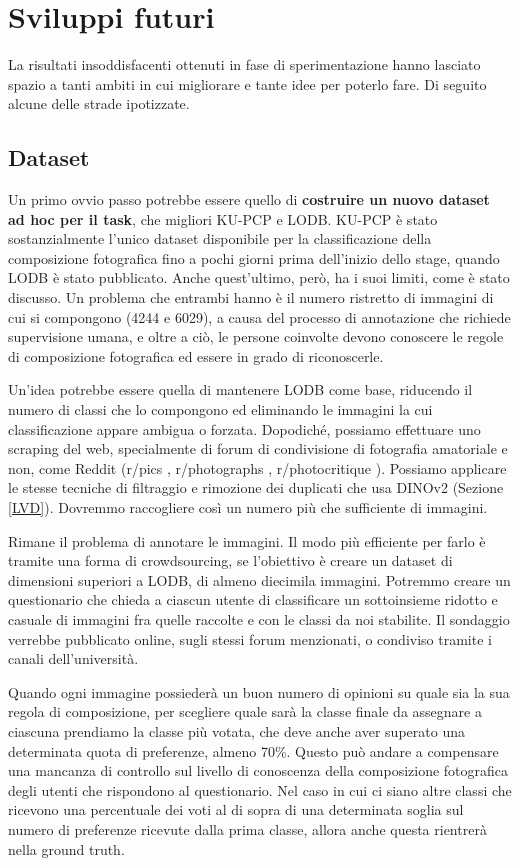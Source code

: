 \section{Sviluppi futuri}
La risultati insoddisfacenti ottenuti in fase di sperimentazione hanno lasciato spazio a tanti ambiti in cui migliorare e tante idee per poterlo fare. Di seguito alcune delle strade ipotizzate.  

\subsection{Dataset}
Un primo ovvio passo potrebbe essere quello di \textbf{costruire un nuovo dataset ad hoc per il task}, che migliori KU-PCP e LODB. KU-PCP è stato sostanzialmente l'unico dataset disponibile per la classificazione della composizione fotografica fino a pochi giorni prima dell'inizio dello stage, quando LODB è stato pubblicato. Anche quest'ultimo, però, ha i suoi limiti, come è stato discusso. Un problema che entrambi hanno è il numero ristretto di immagini di cui si compongono (4244 e 6029), a causa del processo di annotazione che richiede supervisione umana, e oltre a ciò, le persone coinvolte devono conoscere le regole di composizione fotografica ed essere in grado di riconoscerle.

Un'idea potrebbe essere quella di mantenere LODB come base, riducendo il numero di classi che lo compongono ed eliminando le immagini la cui classificazione appare ambigua o forzata. Dopodiché, possiamo effettuare uno scraping del web, specialmente di forum di condivisione di fotografia amatoriale e non, come Reddit (r/pics \cite{rpics_reddit}, r/photographs \cite{rphotographs_reddit}, r/photocritique \cite{rphotocritique_reddit}). Possiamo applicare le stesse tecniche di filtraggio e rimozione dei duplicati che usa DINOv2 (Sezione \ref{LVD}). Dovremmo raccogliere così un numero più che sufficiente di immagini.

Rimane il problema di annotare le immagini. Il modo più efficiente per farlo è tramite una forma di crowdsourcing, se l'obiettivo è creare un dataset di dimensioni superiori a LODB, di almeno diecimila immagini. Potremmo creare un questionario che chieda a ciascun utente di classificare un sottoinsieme ridotto e casuale di immagini fra quelle raccolte e con le classi da noi stabilite. Il sondaggio verrebbe pubblicato online, sugli stessi forum menzionati, o condiviso tramite i canali dell'università.

Quando ogni immagine possiederà un buon numero di opinioni su quale sia la sua regola di composizione, per scegliere quale sarà la classe finale da assegnare a ciascuna prendiamo la classe più votata, che deve anche aver superato una determinata quota di preferenze, almeno 70\%. Questo può andare a compensare una mancanza di controllo sul livello di conoscenza della composizione fotografica degli utenti che rispondono al questionario. Nel caso in cui ci siano altre classi che ricevono una percentuale dei voti al di sopra di una determinata soglia sul numero di preferenze ricevute dalla prima classe, allora anche questa rientrerà nella ground truth. 

